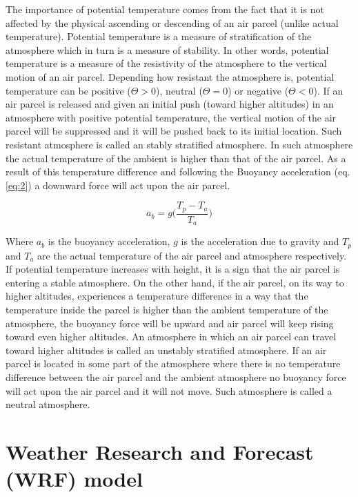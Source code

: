 \documentclass[a4paper,12pt]{article}
\numberwithin{equation}{section} %
\begin{document}
The importance of potential temperature comes from the fact that it is not affected by the physical ascending or descending of an air parcel (unlike actual temperature). Potential temperature is a measure of stratification of the atmosphere which in turn is a measure of stability. In other words, potential temperature is a measure of the resistivity of the atmosphere to the vertical motion of an air parcel. Depending how resistant the atmosphere is, potential temperature can be positive ($\Theta > 0$), neutral ($\Theta = 0$) or negative ($\Theta < 0$). If an air parcel is released and given an initial push (toward higher altitudes) in an atmosphere with positive potential temperature, the vertical motion of the air parcel will be suppressed and it will be pushed back to its initial location. Such resistant atmosphere is called an stably stratified atmosphere. In such atmosphere the actual temperature of the ambient is higher than that of the air parcel. As a result of this temperature difference and following the Buoyancy acceleration (eq. \ref{eq:2}) a downward force will act upon the air parcel.

\vspace{0.5cm}
\begin{equation}\label{eq:2}
a_b = g\bigg(\frac{T_p - T_a}{T_a}\bigg)
\end{equation}

\vspace{0.25cm}

Where $a_b$ is the buoyancy acceleration, $g$ is the acceleration due to gravity and $T_p$ and $T_a$ are the actual temperature of the air parcel and atmosphere respectively. If potential temperature increases with height, it is a sign that the air parcel is entering a stable atmosphere. On the other hand, if the air parcel, on its way to higher altitudes, experiences a temperature difference in a way that the temperature inside the parcel is higher than the ambient temperature of the atmosphere, the buoyancy force will be upward and air parcel will keep rising toward even higher altitudes. An atmosphere in which an air parcel can travel toward higher altitudes is called an unstably stratified atmosphere. If an air parcel is located in some part of the atmosphere where there is no temperature difference between the air parcel and the ambient atmosphere no buoyancy force will act upon the air parcel and it will not move. Such atmosphere is called a neutral atmosphere.

\newpage

\section{Weather Research and Forecast (WRF) model}
\end{document}

